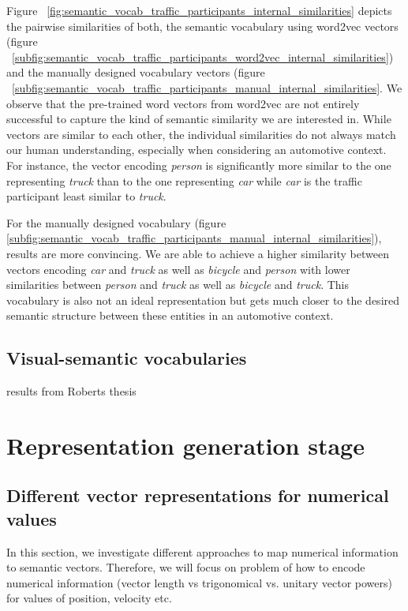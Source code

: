 Figure ~\ref{fig:semantic_vocab_traffic_participants_internal_similarities} depicts the pairwise similarities of both, the semantic vocabulary using word2vec vectors (figure ~\ref{subfig:semantic_vocab_traffic_participants_word2vec_internal_similarities}) and the manually designed vocabulary vectors (figure ~\ref{subfig:semantic_vocab_traffic_participants_manual_internal_similarities}.
We observe that the pre-trained word vectors from word2vec are not entirely successful to capture the kind of semantic similarity we are interested in.
While vectors are similar to each other, the individual similarities do not always match our human understanding, especially when considering an automotive context.
For instance, the vector encoding \emph{person} is significantly more similar to the one representing \emph{truck} than to the one representing \emph{car} while \emph{car} is the traffic participant least similar to \emph{truck}. 

For the manually designed vocabulary (figure \ref{subfig:semantic_vocab_traffic_participants_manual_internal_similarities}), results are more convincing.
We are able to achieve a higher similarity between vectors encoding \emph{car} and \emph{truck} as well as \emph{bicycle} and \emph{person} with lower similarities between \emph{person} and \emph{truck} as well as \emph{bicycle} and \emph{truck}.
This vocabulary is also not an ideal representation but gets much closer to the desired semantic structure between these entities in an automotive context. 

\subsection{Visual-semantic vocabularies}%
\label{subsec:visual_semantic_vocabularies}

results from Roberts thesis

\section{Representation generation stage}%
\label{sec:representation_generation_stage}


\subsection{Different vector representations for numerical values}%
\label{subsec:different_vector_representations_for_numerical_values}


In this section, we investigate different approaches to map numerical information to semantic vectors.
Therefore, we will focus on
problem of how to encode numerical information (vector length vs trigonomical vs. unitary vector powers) for values of position, velocity etc.
